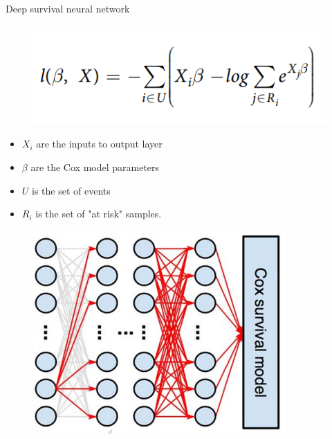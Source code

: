 \documentclass[
]{beamer}
\begin{document}
	\begin{frame}[plain]{Deep survival neural network}
		\begin{figure}
			\centering
			\includegraphics[scale=0.5]{loglik1}
		\end{figure}
		\begin{itemize}
			\item $X_i$ are the inputs to output layer
			\item $\beta$ are the Cox model parameters
			\item $U$ is the set of events
			\item $R_i$ is the set of "at risk" samples.
		\end{itemize}
		\begin{figure}
			\includegraphics[scale=0.5]{nn2}
		\end{figure}
	\end{frame}
	
\end{document}
